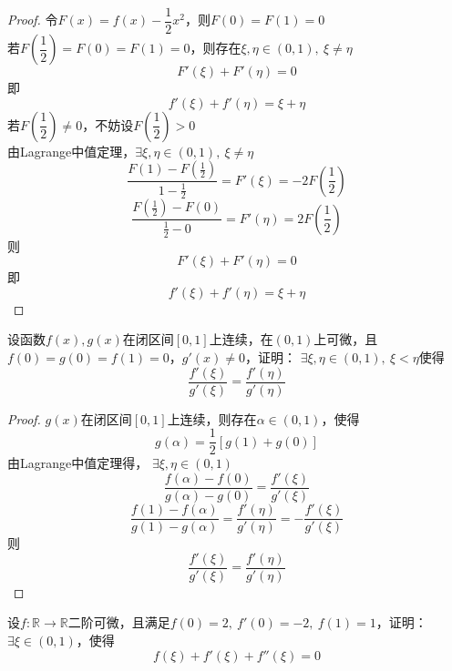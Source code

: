\begin{proof}

    令$F(x) = f(x) - \dfrac{1}{2}x^2$，则$F(0) = F(1) = 0$ \\
    若$F\left( \dfrac{1}{2} \right) = F(0) = F(1) = 0$，则存在$\xi,\eta \in (0,1),\ \xi \neq \eta$
    $$F'(\xi) + F'(\eta) = 0$$
    即
    $$f'(\xi) + f'(\eta) = \xi + \eta$$
    若$F\left( \dfrac{1}{2} \right) \neq 0$，不妨设$F\left( \dfrac{1}{2} \right) > 0$ \\
    由\textup{Lagrange}中值定理，$\exists \xi,\eta \in (0,1),\ \xi \neq \eta$
    $$ \dfrac{F(1) - F(\frac{1}{2})}{1 - \frac{1}{2}} = F'(\xi) = -2F\left( \dfrac{1}{2} \right)$$
    $$ \dfrac{F(\frac{1}{2}) - F(0)}{\frac{1}{2} - 0} = F'(\eta) = 2F\left( \dfrac{1}{2} \right)$$
    则
    $$F'(\xi) + F'(\eta) = 0$$
    即
    $$f'(\xi) + f'(\eta) = \xi + \eta$$

\end{proof}

\begin{proposition}

    设函数$f(x),g(x)$在闭区间$[0,1]$上连续，在$(0,1)$上可微，且$f(0) = g(0) = f(1) = 0$，$g'(x) \neq 0$，证明： $\exists \xi,\eta \in (0,1),\ \xi < \eta$使得
    $$\dfrac{f'(\xi)}{g'(\xi)} = \dfrac{f'(\eta)}{g'(\eta)}$$

\end{proposition}

\begin{proof}

    $g(x)$在闭区间$[0,1]$上连续，则存在$\alpha \in (0,1)$，使得
    $$g(\alpha) = \dfrac{1}{2}[g(1) + g(0)]$$
    由\textup{Lagrange}中值定理得， $\exists \xi,\eta \in (0,1)$
    $$\dfrac{f(\alpha) - f(0)}{g(\alpha) - g(0)} = \dfrac{f'(\xi)}{g'(\xi)}$$
    $$\dfrac{f(1) - f(\alpha)}{g(1) - g(\alpha)} = \dfrac{f'(\eta)}{g'(\eta)} = -\dfrac{f'(\xi)}{g'(\xi)}$$
    则
    $$\dfrac{f'(\xi)}{g'(\xi)} = \dfrac{f'(\eta)}{g'(\eta)}$$

\end{proof}

\begin{proposition}

    设$f:\mathbb{R}\to\mathbb{R}$二阶可微，且满足$f(0) = 2,\ f'(0) = -2,\ f(1) = 1$，证明：$\exists \xi \in (0,1)$，使得
    $$f(\xi) + f'(\xi) + f''(\xi) = 0$$

\end{proposition}

